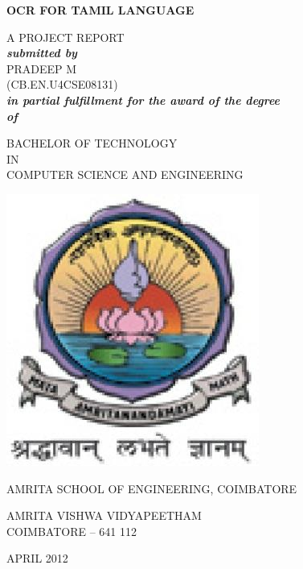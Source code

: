 
\begin{center}

% 
% 
\Large{
\textbf{ 
OCR FOR TAMIL LANGUAGE  
}
}
\begin{spacing}{2.0}
\end{spacing}
\onehalfspacing

\large{A PROJECT REPORT \\
\textbf{ \emph{submitted by}} \\
}
\Large{
PRADEEP M  \\
(CB.EN.U4CSE08131) \\
\textbf{
\emph{in partial fulfillment for the award of the degree\\ of\\}
}
}
\large{
BACHELOR OF TECHNOLOGY \\
IN \\
COMPUTER SCIENCE AND ENGINEERING \\ 

 \begin{spacing}{2.0}
\end{spacing}
\includegraphics[scale=0.5]{./img/am_logo}
\begin{spacing}{2.0}
\end{spacing}

AMRITA SCHOOL OF ENGINEERING, COIMBATORE\\
}
\Large{AMRITA VISHWA VIDYAPEETHAM} 
\\
COIMBATORE – 641 112	  \\
\begin{spacing}{2.0}
\end{spacing}
\large{
APRIL 2012
}
\end{center}